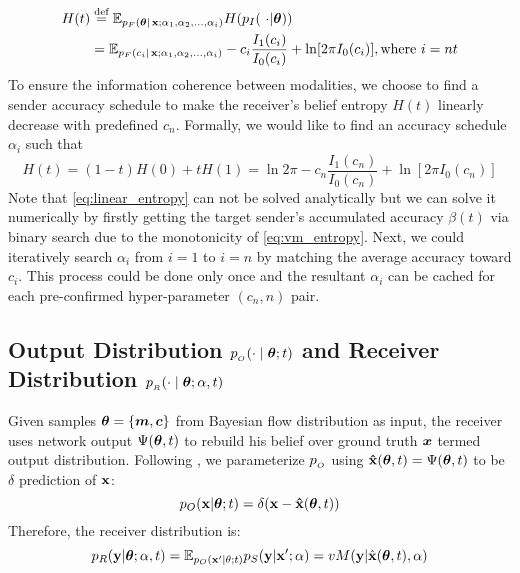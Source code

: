 \begin{align}
    H(t)&\stackrel{\text{def}}{=} \mathbb{E}_{p_F(\bm{\theta}|\operatorname{\mathbf{x}};\alpha_1,\alpha_2,\dots,\alpha_i)}H(p_I(~\cdot|\bm{\theta}))\\
&=\mathbb{E}_{p_F(c_i|\operatorname{\mathbf{x}};\alpha_1,\alpha_2,\dots,\alpha_i)}-c_i\frac{I_1(c_i)}{I_0(c_i)}+\ln[2\pi I_0(c_i)], \text{where}~i=nt
\end{align}
To ensure the information coherence between modalities, we choose to find a sender accuracy schedule to make the receiver's belief entropy $H(t)$ linearly decrease with predefined $c_n$. Formally, we would like to find an accuracy schedule $\alpha_i$ such that
\begin{equation}\label{eq:linear_entropy}
    H(t)=(1-t)H(0)+tH(1)=\ln 2\pi -c_n\frac{I_1(c_n)}{I_0(c_n)}+\ln[2\pi I_0(c_n)]
\end{equation}
Note that \cref{eq:linear_entropy} can not be solved analytically but we can solve it numerically by firstly getting the target sender's accumulated accuracy $\beta(t)$ via binary search due to the monotonicity of \cref{eq:vm_entropy}. Next, we could iteratively search $\alpha_i$ from $i=1$ to $i=n$ by matching the average accuracy toward $c_i$. This process could be done only once and the resultant $\alpha_i$ can be cached for each pre-confirmed hyper-parameter $(c_n, n)$ pair.

\subsection{Output Distribution \texorpdfstring{$p_{_O}(\cdot \mid \boldsymbol{\theta};t)$}{} and Receiver Distribution \texorpdfstring{$p_{_R}(\cdot \mid \boldsymbol{\theta}; \alpha,t)$}{}}
Given samples $\bm{\theta}=\{{\bm{m}},{\bm{c}}\}$ from Bayesian flow distribution as input, the receiver uses network output $\Psi(\bm{\theta},t)$ to rebuild his belief over ground truth ${\bm{x}}$ termed output distribution. Following \citet{bfn}, we parameterize $p_{_O}$ using $\bold{\hat{x}}(\boldsymbol\theta,t)=\Psi(\bm{\theta},t)$ to be $\delta$ prediction of $\operatorname{\mathbf{x}}$:
\begin{equation}
    p_O(\bold{x}|\boldsymbol\theta;t)=\delta(\bold{x}-\bold{\hat{x}}(\boldsymbol\theta,t))
\end{equation}
Therefore, the receiver distribution is:
\begin{equation}
p_R(\bold{y}|\boldsymbol\theta;\alpha,t)=\mathbb{E}_{p_O(\bold{x}'|\theta;t)}p_S(\bold{y}|\bold{x}';\alpha)=vM(\bold{y}|\hat{\bold{x}}(\boldsymbol\theta,t),\alpha)
\end{equation}

